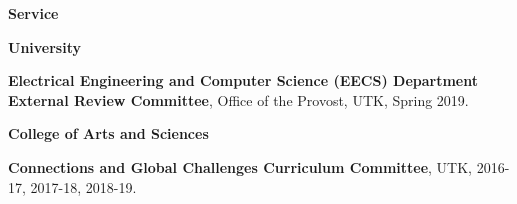 \documentclass[11pt]{letter}
\begin{document}
%
%	
%
%

	\smallskip
	
{\LARGE\bf Service}
	\begin{description}
	\item
{\Large\bf University}
	\begin{description}
	\item
\textbf{Electrical Engineering and Computer Science (EECS) Department External Review Committee}, Office of the Provost, UTK, Spring 2019.
	\end{description}


	\item
{\Large\bf College of Arts and Sciences}
	\begin{description}
	\item
\textbf{Connections and Global Challenges Curriculum Committee}, UTK, 2016-17, 2017-18, 2018-19.
	\end{description}
	

\end{description}
\end{document}
